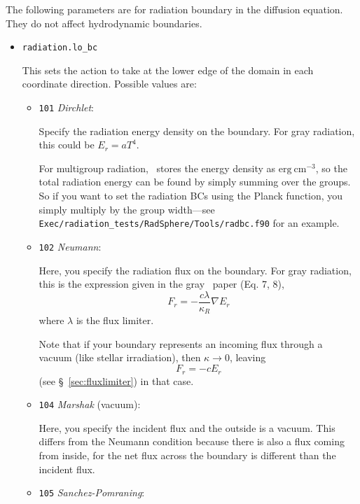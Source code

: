 The following parameters are for radiation boundary in the diffusion
equation. They do not affect hydrodynamic boundaries.
\begin{itemize}
\item {\tt radiation.lo\_bc}
  
  This sets the action to take at the lower edge of the domain in
  each coordinate direction.  Possible values are:
  \begin{itemize}

  \item {\tt 101} {\em Dirchlet}:

    Specify the radiation energy density on the boundary.
    For gray radiation, this could be $E_r = a T^4$.

    For multigroup radiation,  \castro\ stores the energy density as
    $\mathrm{erg}~\mathrm{cm}^{-3}$, so the total radiation energy
    can be found by simply summing over the groups.  So if you want
    to set the radiation BCs using the Planck function, you simply
    multiply by the group width---see {\tt Exec/radiation\_tests/RadSphere/Tools/radbc.f90}
    for an example.

  \item {\tt 102} {\em Neumann}:

    Here, you specify the radiation flux on the boundary.  For gray
    radiation, this is the expression given in the gray \castro\ paper
    (Eq. 7, 8),
    \begin{equation}
      F_r = - \frac{c\lambda}{\kappa_R} \nabla E_r
    \end{equation}
    where $\lambda$ is the flux limiter.

    Note that if your boundary represents an incoming flux through
    a vacuum (like stellar irradiation), then $\kappa \rightarrow 0$, leaving
    \begin{equation}
      F_r = -c E_r
    \end{equation}
    (see \S~\ref{sec:fluxlimiter}) in that case.  

  \item {\tt 104} {\em Marshak} (vacuum):
      
    Here, you specify the incident flux and the outside is a vacuum.
    This differs from the Neumann condition because there is also a
    flux coming from inside, for the net flux across the boundary is
    different than the incident flux.

  \item {\tt 105} {\em Sanchez-Pomraning}:


\end{itemize}
\end{itemize}
